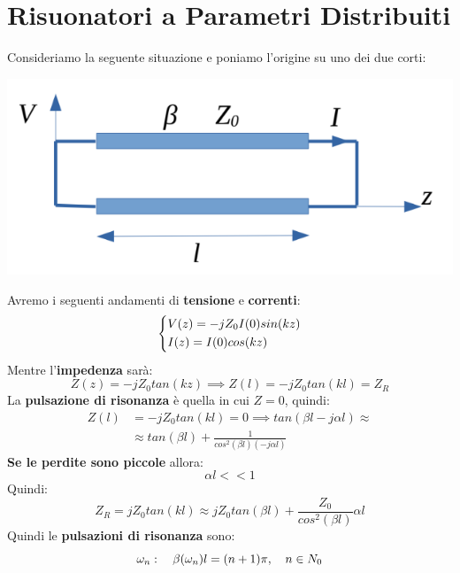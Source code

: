 \section{Risuonatori a Parametri Distribuiti}
Consideriamo la seguente situazione e poniamo l'origine su uno dei due corti:
\begin{center}
    \includegraphics[width=.8\textwidth]{Images/figure28.png}
\end{center}
Avremo i seguenti andamenti di \textbf{tensione} e \textbf{correnti}:
\begin{equation*}
    \begin{dcases}
    V(z) = - j Z_0 I(0) sin(kz)\\
    I(z) = I(0) cos(kz)
    \end{dcases}
\end{equation*}
Mentre l'\textbf{impedenza} sarà:
\begin{equation*}
    Z(z) = - j Z_0 tan(kz) \implies Z(l) = - j Z_0 tan(kl) = Z_R
\end{equation*}
La \textbf{pulsazione di risonanza} è quella in cui $Z = 0$, quindi:
\begin{equation*}
\begin{aligned}
    Z(l) &=  - j Z_0 tan(kl) = 0 \implies tan(\beta l - j \alpha l) \approx \\
    &\approx  tan(\beta l) + \frac{1}{cos^2(\beta l) (-j \alpha l)}
\end{aligned}
\end{equation*}
\textbf{Se le perdite sono piccole} allora:
\begin{equation*}
    \alpha l << 1
\end{equation*}
Quindi:
\begin{equation*}
    Z_R = j Z_0 tan(kl) \approx j Z_0 tan(\beta l) + \frac{Z_0}{cos^2(\beta l)} \alpha l
\end{equation*}
Quindi le\textbf{ pulsazioni di risonanza} sono:
\begin{equation*}
    \omega_n: \quad \beta(\omega_n) l = (n+1)\pi, \quad n \in N_0
\end{equation*}

